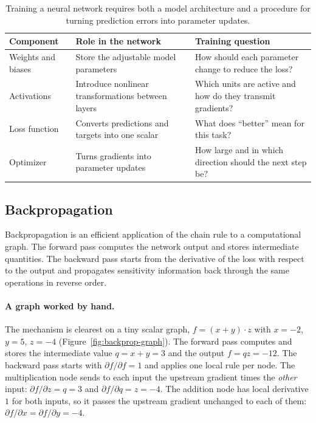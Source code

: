 \begin{table}[ht]
  \centering
  \begin{tabular}{@{}p{3.0cm}p{5.1cm}p{5.1cm}@{}}
    \toprule
    Component & Role in the network & Training question \\
    \midrule
    Weights and biases & Store the adjustable model parameters &
      How should each parameter change to reduce the loss? \\
    Activations & Introduce nonlinear transformations between layers &
      Which units are active and how do they transmit gradients? \\
    Loss function & Converts predictions and targets into one scalar &
      What does ``better'' mean for this task? \\
    Optimizer & Turns gradients into parameter updates &
      How large and in which direction should the next step be? \\
    \bottomrule
  \end{tabular}
  \caption{Training a neural network requires both a model architecture and a
  procedure for turning prediction errors into parameter updates.}
\end{table}

\subsection{Backpropagation}

Backpropagation is an efficient application of the chain rule to a computational
graph. The forward pass computes the network output and stores intermediate
quantities. The backward pass starts from the derivative of the loss with
respect to the output and propagates sensitivity information back through the
same operations in reverse order.

\paragraph{A graph worked by hand.}
The mechanism is clearest on a tiny scalar graph, $f = (x+y)\cdot z$ with
$x=-2$, $y=5$, $z=-4$ (Figure~\ref{fig:backprop-graph}). The forward pass
computes and stores the intermediate value $q = x + y = 3$ and the output
$f = qz = -12$. The backward pass starts with $\partial f/\partial f = 1$ and
applies one local rule per node. The multiplication node sends to each input the
upstream gradient times the \emph{other} input:
$\partial f/\partial z = q = 3$ and $\partial f/\partial q = z = -4$. The
addition node has local derivative $1$ for both inputs, so it passes the
upstream gradient unchanged to each of them:
$\partial f/\partial x = \partial f/\partial y = -4$.

